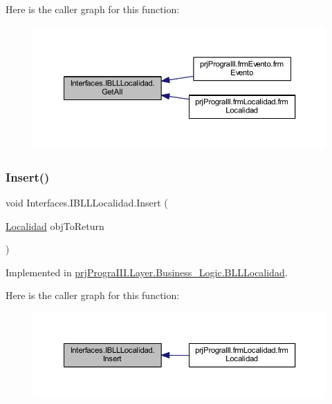 Here is the caller graph for this function\+:
\nopagebreak
\begin{figure}[H]
\begin{center}
\leavevmode
\includegraphics[width=350pt]{interface_interfaces_1_1_i_b_l_l_localidad_afc2e7478f3ffcee4730c47a9cfb0cfca_icgraph}
\end{center}
\end{figure}
\hypertarget{interface_interfaces_1_1_i_b_l_l_localidad_a7bd5604308ad6d5a277cc70207125274}{}\label{interface_interfaces_1_1_i_b_l_l_localidad_a7bd5604308ad6d5a277cc70207125274} 
\subsubsection{\texorpdfstring{Insert()}{Insert()}}
{\footnotesize\ttfamily void Interfaces.\+I\+B\+L\+L\+Localidad.\+Insert (\begin{DoxyParamCaption}\item[{\hyperlink{classprj_progra_i_i_i_1_1_layer_1_1_entities_1_1_localidad}{Localidad}}]{obj\+To\+Return }\end{DoxyParamCaption})}



Implemented in \hyperlink{classprj_progra_i_i_i_1_1_layer_1_1_business___logic_1_1_b_l_l_localidad_a4c0ae52352d4acd717e66a511e667350}{prj\+Progra\+I\+I\+I.\+Layer.\+Business\+\_\+\+Logic.\+B\+L\+L\+Localidad}.

Here is the caller graph for this function\+:
\nopagebreak
\begin{figure}[H]
\begin{center}
\leavevmode
\includegraphics[width=350pt]{interface_interfaces_1_1_i_b_l_l_localidad_a7bd5604308ad6d5a277cc70207125274_icgraph}
\end{center}
\end{figure}


